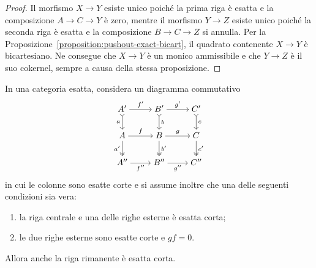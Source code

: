 \begin{proof}
  Il morfismo \(X \to Y\) esiste unico poiché la prima riga è esatta e la
  composizione \(A \to C \to Y\) è zero, mentre il morfismo \(Y \to Z\) esiste
  unico poiché la seconda riga è esatta e la composizione
  \(B \to C \to Z\) si annulla. Per la
  Proposizione~\ref{proposition:pushout-exact-bicart}, il quadrato
  contenente \(X \to Y\) è bicartesiano. Ne consegue che \(X \to Y\) è un
  monico ammissibile e che \(Y \to Z\) è il suo cokernel, sempre a causa
  della stessa proposizione.
\end{proof}

\begin{corollary}
  \label{cor:3x3-lemma}
  In una categoria esatta, considera un diagramma commutativo
  \[
    \begin{tikzcd}[cramped]
      A' \ar["{a}", rightarrowtail, d, swap] \ar["{f'}", r] & B'
      \ar["{b}", rightarrowtail, d]
      \ar["{g'}", r] & C' \ar["{c}", rightarrowtail, d] \\
      A \ar["{a'}", twoheadrightarrow, d, swap] \ar["{f}", r] & B
      \ar["{b'}", twoheadrightarrow, d]
      \ar["{g}", r] & C \ar["{c'}", twoheadrightarrow, d] \\
      A'' \ar["{f''}", r, swap] & B'' \ar["{g''}", r, swap] & C''
    \end{tikzcd}
  \]
  in cui le colonne sono esatte corte e si assume inoltre che una delle
  seguenti condizioni sia vera:
  \begin{enumerate}[label=(\roman*), ref=(\roman*), leftmargin=*]
  \item \label{item:3x3-lemma-1} la riga centrale e una delle righe
    esterne è esatta corta;
  \item \label{item:3x3-lemma-2} le due righe esterne sono esatte corte
    e \(gf = 0\).
  \end{enumerate}
  Allora anche la riga rimanente è esatta corta.
\end{corollary}

